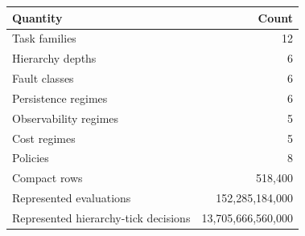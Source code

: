 \begin{tabular}{lr}
\toprule
Quantity & Count \\
\midrule
Task families & 12 \\
Hierarchy depths & 6 \\
Fault classes & 6 \\
Persistence regimes & 6 \\
Observability regimes & 5 \\
Cost regimes & 5 \\
Policies & 8 \\
Compact rows & 518,400 \\
Represented evaluations & 152,285,184,000 \\
Represented hierarchy-tick decisions & 13,705,666,560,000 \\
\bottomrule
\end{tabular}
